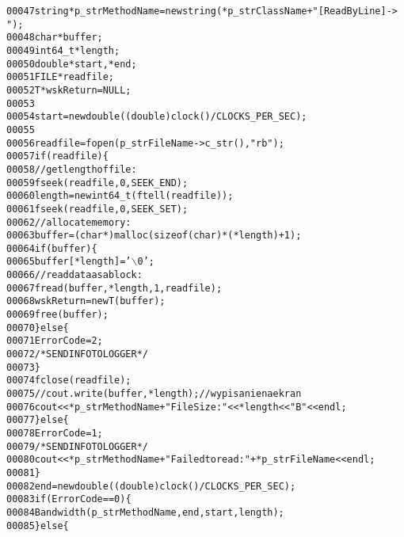 \begin{footnotesize}
\begin{alltt}
00047             \textcolor{keywordtype}{string} *p\_strMethodName = \textcolor{keyword}{new} string (*p\_strClassName+\textcolor{stringliteral}{"[ReadByLine]->
      "});
00048             \textcolor{keywordtype}{char} *buffer;
00049             int64\_t *length;
00050             \textcolor{keywordtype}{double} *start,*end;
00051             FILE *readfile;
00052             T *wskReturn = NULL;
00053 
00054             start = \textcolor{keyword}{new} double ((\textcolor{keywordtype}{double})clock()/CLOCKS\_PER\_SEC);
00055 
00056             readfile = fopen(p\_strFileName->c\_str(), \textcolor{stringliteral}{"rb"});
00057             \textcolor{keywordflow}{if}(readfile)\{
00058                 \textcolor{comment}{// get length of file:}
00059                 fseek(readfile, 0, SEEK\_END);
00060                 length = \textcolor{keyword}{new} int64\_t (ftell(readfile));
00061                 fseek(readfile, 0, SEEK\_SET);
00062                 \textcolor{comment}{// allocate memory:}
00063                 buffer=(\textcolor{keywordtype}{char} *)malloc(\textcolor{keyword}{sizeof}(\textcolor{keywordtype}{char})* (*length)+1);
00064                 \textcolor{keywordflow}{if} (buffer)\{
00065                     buffer[*length]=\textcolor{charliteral}{'\(\backslash\)0'};
00066                     \textcolor{comment}{// read data as a block:}
00067                     fread(buffer, *length, 1, readfile);
00068                     wskReturn = \textcolor{keyword}{new} T(buffer);
00069                     free(buffer);
00070                 \}\textcolor{keywordflow}{else}\{
00071                     ErrorCode = 2;
00072                     \textcolor{comment}{/*SEND INFO TO LOGGER*/}
00073                 \}
00074                 fclose(readfile);
00075                 \textcolor{comment}{//cout.write (buffer,*length); // wypisanie na ekran}
00076                 cout<<*p\_strMethodName+\textcolor{stringliteral}{"File Size: "}<<*length<<\textcolor{stringliteral}{" B"}<<endl;
00077             \}\textcolor{keywordflow}{else}\{
00078                 ErrorCode = 1;
00079                 \textcolor{comment}{/*SEND INFO TO LOGGER*/}
00080                 cout<<*p\_strMethodName+\textcolor{stringliteral}{"Failed to read: "}+ *p\_strFileName<<endl;
00081             \}
00082             end = \textcolor{keyword}{new} double((\textcolor{keywordtype}{double})clock()/CLOCKS\_PER\_SEC);
00083             \textcolor{keywordflow}{if} ( ErrorCode == 0)\{
00084                 Bandwidth(p\_strMethodName,end,start,length);
00085             \}\textcolor{keywordflow}{else}\{

\end{alltt}
\end{footnotesize}
